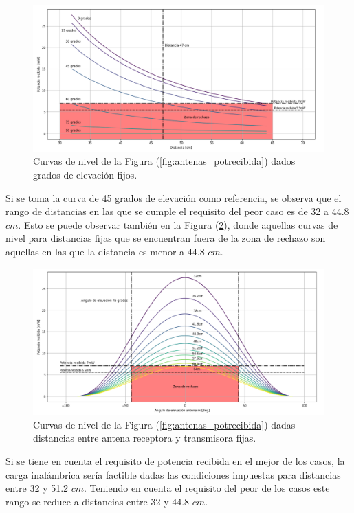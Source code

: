 \begin{figure}[H]
	\centering
	\includegraphics[width=\linewidth]{ImagenesFactibilidad/antenas_curva_distancia}
	\caption{Curvas de nivel de la Figura (\ref{fig:antenas_potrecibida}) dados grados de elevación fijos.}
	\label{fig:antenas_curva_distancia}
\end{figure}

Si se toma la curva de 45 grados de elevación como referencia, se observa que el rango de distancias en las que se cumple el requisito del peor caso es de 32 a 44.8 $cm$. Esto se puede observar también en la Figura (\ref{fig:antenas_curva_elevacion}), donde aquellas curvas de nivel para distancias fijas que se encuentran fuera de la zona de rechazo son aquellas en las que la distancia es menor a 44.8 $cm$.

\begin{figure}[H]
	\centering
	\includegraphics[width=\linewidth]{ImagenesFactibilidad/antenas_curva_elevacion}
	\caption{Curvas de nivel de la Figura (\ref{fig:antenas_potrecibida}) dadas distancias entre antena receptora y transmisora fijas.}
	\label{fig:antenas_curva_elevacion}
\end{figure}

Si se tiene en cuenta el requisito de potencia recibida en el mejor de los casos, la carga inalámbrica sería factible dadas las condiciones impuestas para distancias entre 32 y 51.2 $cm$. Teniendo en cuenta el requisito del peor de los casos este rango se reduce a distancias entre 32 y 44.8 $cm$.

